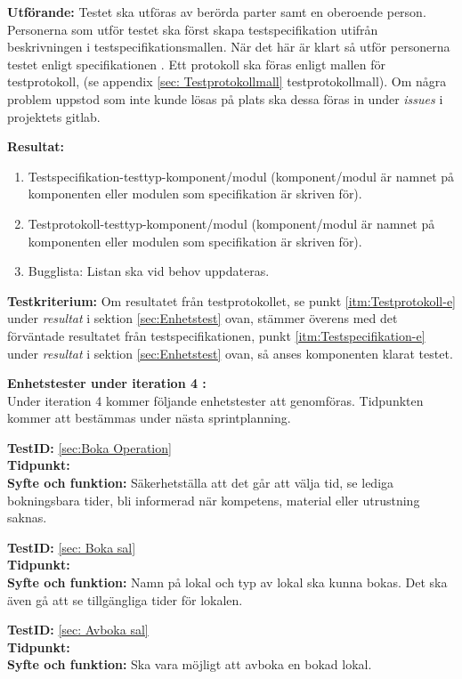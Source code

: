 \documentclass[a4paper,10pt, twoside]{article}
\begin{document}
\textbf{Utförande:} Testet ska utföras av berörda parter samt en oberoende person. Personerna som utför testet ska först skapa testspecifikation utifrån beskrivningen i testspecifikationsmallen. När det här är klart så utför personerna testet enligt specifikationen \cite{kravspec}. Ett protokoll ska föras enligt mallen för testprotokoll, (se appendix \ref{sec: Testprotokollmall} testprotokollmall). Om några problem uppstod som inte kunde lösas på plats ska dessa föras in under \emph{issues} i projektets gitlab.

\textbf{Resultat:}
	\begin{enumerate}
    	\item \label{itm:Testspecifikation-e} Testspecifikation-testtyp-komponent/modul (komponent/modul är namnet på 					  komponenten eller modulen som specifikation är skriven för).
      	\item \label{itm:Testprotokoll-e} Testprotokoll-testtyp-komponent/modul (komponent/modul är namnet på komponenten 				  eller modulen som specifikation är skriven för).
      	\item Bugglista: Listan ska vid behov uppdateras.
    \end{enumerate}

\textbf{Testkriterium:} Om resultatet från testprotokollet, se punkt \ref{itm:Testprotokoll-e} under \emph{resultat} i 	   sektion \ref{sec:Enhetstest} ovan, stämmer överens med det förväntade resultatet från testspecifikationen, punkt \ref{itm:Testspecifikation-e} under \emph{resultat} i sektion \ref{sec:Enhetstest} ovan, så anses komponenten klarat testet.

\textbf{Enhetstester under iteration 4 :} 
\\  Under iteration 4 kommer följande enhetstester att genomföras. Tidpunkten kommer att bestämmas under nästa sprintplanning.

\textbf{TestID:} \ref{sec:Boka Operation}
\\ \textbf{Tidpunkt:}
\\ \textbf{Syfte och funktion:} Säkerhetställa att det går att välja tid, se lediga bokningsbara tider, bli informerad när kompetens, material eller utrustning saknas.
  
\textbf{TestID:} \ref{sec: Boka sal} 
\\ \textbf{Tidpunkt:}
\\ \textbf{Syfte och funktion:} Namn på lokal och typ av lokal ska kunna bokas. Det ska även gå att se tillgängliga tider för lokalen.

\textbf{TestID:} \ref{sec: Avboka sal}
\\ \textbf{Tidpunkt:}
\\ \textbf{Syfte och funktion:} Ska vara möjligt att avboka en bokad lokal.
  
\end{document}

